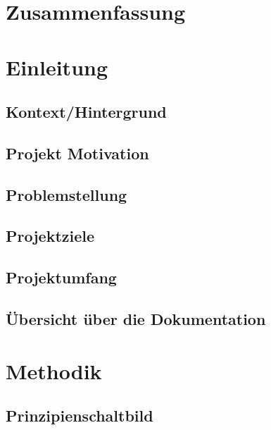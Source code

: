 
\section{Zusammenfassung}\label{sec:zusammenfassung}



\section{Einleitung}\label{sec:einleitung}



\subsection{Kontext/Hintergrund}


\subsection{Projekt Motivation}


\subsection{Problemstellung}


\subsection{Projektziele}


\subsection{Projektumfang}


\subsection{Übersicht über die Dokumentation}


\section{Methodik}\label{sec:methodik}



\subsection{Prinzipienschaltbild}\label{subsec:prinzipienschaltbild}

